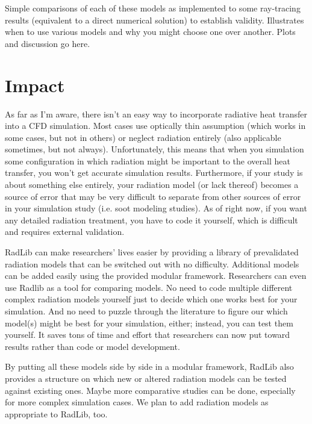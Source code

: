 \documentclass[preprint,12pt, a4paper]{elsarticle}
\begin{document}
Simple comparisons of each of these models as implemented to some ray-tracing results (equivalent to a direct numerical solution) to establish validity. Illustrates when to use various models and why you might choose one over another. Plots and discussion go here. 


\section{Impact}
\label{s:impact}

As far as I'm aware, there isn't an easy way to incorporate radiative heat transfer into a CFD simulation. Most cases use optically thin assumption (which works in some cases, but not in others) or neglect radiation entirely (also applicable sometimes, but not always). Unfortunately, this means that when you simulation some configuration in which radiation might be important to the overall heat transfer, you won't get accurate simulation results. Furthermore, if your study is about something else entirely, your radiation model (or lack thereof) becomes a source of error that may be very difficult to separate from other sources of error in your simulation study (i.e. soot modeling studies). As of right now, if you want any detailed radiation treatment, you have to code it yourself, which is difficult and requires external validation. 

RadLib can make researchers' lives easier by providing a library of prevalidated radiation models that can be switched out with no difficulty. Additional models can be added easily using the provided modular framework. Researchers can even use Radlib as a tool for comparing models. No need to code multiple different complex radiation models yourself just to decide which one works best for your simulation. And no need to puzzle through the literature to figure our which model(s) might be best for your simulation, either; instead, you can test them yourself. It saves tons of time and effort that researchers can now put toward results rather than code or model development. 

By putting all these models side by side in a modular framework, RadLib also provides a structure on which new or altered radiation models can be tested against existing ones. Maybe more comparative studies can be done, especially for more complex simulation cases. We plan to add radiation models as appropriate to RadLib, too. 
\end{document}
